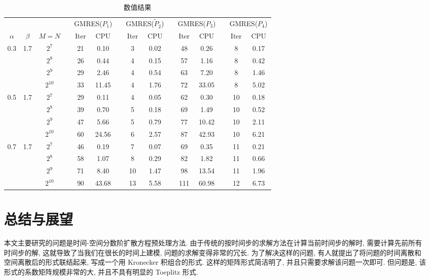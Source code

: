 \documentclass{ecnumaster}
\begin{document}
\begin{table}[H]
\centering
\caption{数值结果} \label{tab4-4-6}\smallskip
\begin{tabular}{ccccccccccccccc} \toprule
& &  && \multicolumn{2}{c}{GMRES($P_1$)}
&& \multicolumn{2}{c}{GMRES($\tilde{P}_2$)}
&& \multicolumn{2}{c}{GMRES($P_3$)}
&& \multicolumn{2}{c}{GMRES($P_4$)} \\
$\alpha$ & $\beta$ & $M = N$ && Iter & CPU && Iter & CPU
&& Iter & CPU && Iter & CPU\\ \midrule
0.3 & 1.7
 & $2^7$     && 21 & 0.10 && 3 & 0.02 && 48 & 0.26 && 8 & 0.17\\
&& $2^8$     && 26 & 0.44 && 4 & 0.15 && 57 & 1.16 && 8 & 0.42\\
&& $2^9$     && 29 & 2.46 && 4 & 0.54 && 63 & 7.20 && 8 & 1.46\\
&& $2^{10}$  && 33 & 11.45 && 4 & 1.76 && 72 & 33.05 && 8 & 5.02 \\ \midrule
0.5 & 1.7
 & $2^7$     && 29 & 0.11 && 4 & 0.05 && 62 & 0.30 && 10 & 0.18\\
&& $2^8$     && 39 & 0.70 && 5 & 0.18 && 69 & 1.49 && 10 & 0.52 \\
&& $2^9$     && 47 & 5.66 && 5 & 0.79 && 77 & 10.42 && 10 & 2.11 \\
&& $2^{10}$  && 60 & 24.56 && 6 & 2.57 && 87 & 42.93 && 10 & 6.21  \\ \midrule
0.7 & 1.7
 & $2^7$     && 46 & 0.19 && 7 & 0.07 && 69 & 0.35 && 11 & 0.21 \\
&& $2^8$     && 58 & 1.07 && 8 & 0.29 && 82 & 1.82 && 11 & 0.66 \\
&& $2^9$     && 71 & 8.40 && 10 & 1.47 && 98 & 13.54 && 11 & 1.96 \\
&& $2^{10}$  && 90 & 43.68 && 13 & 5.58 && 111 & 60.98 && 12 & 6.73 \\ \bottomrule
\end{tabular}
\end{table}

\chapter{总结与展望}
本文主要研究的问题是时间-空间分数阶扩散方程预处理方法.
由于传统的按时间步的求解方法在计算当前时间步的解时,
需要计算先前所有时间步的解,
这就导致了当我们在很长的时间上建模,
问题的求解变得非常的冗长.
为了解决这样的问题,
有人就提出了将问题的时间离散和空间离散后的形式联结起来,
写成一个用 Kronecker 积组合的形式.
这样的矩阵形式简洁明了,
并且只需要求解该问题一次即可.
但问题是,
该形式的系数矩阵规模非常的大,
并且不具有明显的 Toeplitz 形式.
\end{document}
